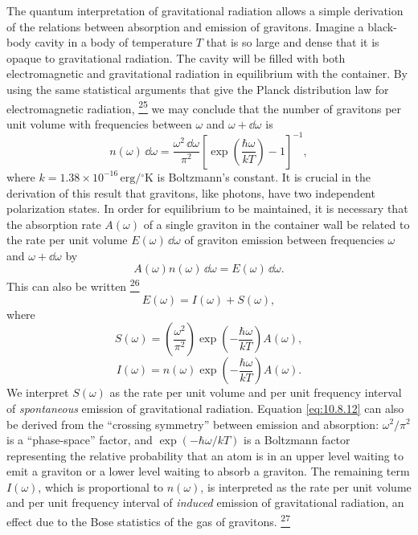 The quantum interpretation of gravitational radiation allows a simple
derivation of the relations between absorption and emission of gravitons.
Imagine a black-body cavity in a body of temperature \(T\) that is so large
and dense that it is opaque to gravitational radiation. The cavity will be
filled with both electromagnetic and gravitational radiation in equilibrium
with the container. By using the same statistical arguments that give the
Planck distribution law for electromagnetic radiation,%
\hyperref[ch10-ref-25]{\textsuperscript{25}}
we may conclude that the number of gravitons per unit volume with frequencies
between \(\omega\) and \(\omega+\dd\omega\) is
\begin{equation}
  n(\omega)\,\dd\omega
  =
  \frac{\omega^2\,\dd\omega}{\pi^2}
  \left[
    \exp\!\left(\frac{\hbar\omega}{kT}\right)-1
  \right]^{-1},
  \tag{10.8.9}\label{eq:10.8.9}
\end{equation}
where \(k=1.38\times10^{-16}\,\mathrm{erg/{}^\circ K}\) is Boltzmann's
constant. It is crucial in the derivation of this result that gravitons, like
photons, have two independent polarization states. In order for equilibrium to
be maintained, it is necessary that the absorption rate \(A(\omega)\) of a
single graviton in the container wall be related to the rate per unit volume
\(E(\omega)\,\dd\omega\) of graviton emission between frequencies \(\omega\)
and \(\omega+\dd\omega\) by
\begin{equation}
  A(\omega)n(\omega)\,\dd\omega=E(\omega)\,\dd\omega.
  \tag{10.8.10}\label{eq:10.8.10}
\end{equation}
This can also be written%
\hyperref[ch10-ref-26]{\textsuperscript{26}}
\begin{equation}
  E(\omega)=I(\omega)+S(\omega),
  \tag{10.8.11}\label{eq:10.8.11}
\end{equation}
where
\begin{equation}
  S(\omega)
  =
  \left(\frac{\omega^2}{\pi^2}\right)
  \exp\!\left(-\frac{\hbar\omega}{kT}\right)A(\omega),
  \tag{10.8.12}\label{eq:10.8.12}
\end{equation}
\begin{equation}
  I(\omega)
  =
  n(\omega)
  \exp\!\left(-\frac{\hbar\omega}{kT}\right)A(\omega).
  \tag{10.8.13}\label{eq:10.8.13}
\end{equation}
We interpret \(S(\omega)\) as the rate per unit volume and per unit frequency
interval of \emph{spontaneous} emission of gravitational radiation. Equation
\eqref{eq:10.8.12} can also be derived from the ``crossing symmetry''
between emission and absorption: \(\omega^2/\pi^2\) is a ``phase-space''
factor, and \(\exp(-\hbar\omega/kT)\) is a Boltzmann factor representing the
relative probability that an atom is in an upper level waiting to emit a
graviton or a lower level waiting to absorb a graviton. The remaining term
\(I(\omega)\), which is proportional to \(n(\omega)\), is interpreted as the
rate per unit volume and per unit frequency interval of \emph{induced}
emission of gravitational radiation, an effect due to the Bose statistics of
the gas of gravitons.%
\hyperref[ch10-ref-27]{\textsuperscript{27}}


